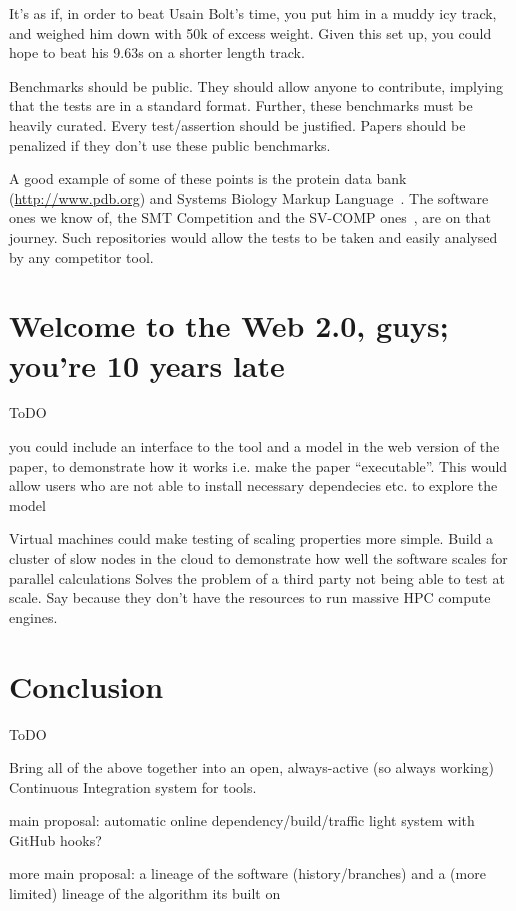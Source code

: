 \documentclass[conference]{IEEEtran}
\begin{document}
It's as if, in order to beat Usain Bolt's time, you put him in a muddy
icy track, and weighed him down with 50k of excess weight. Given this
set up, you could hope to beat his 9.63s on a shorter length track.

Benchmarks should be public. They should allow anyone to contribute,
implying that the tests are in a standard format. Further, these
benchmarks must be heavily curated. Every test/assertion should be
justified. Papers should be penalized if they don't use these public
benchmarks.

A good example of some of these points is the protein data bank
(\url{http://www.pdb.org}) and Systems Biology Markup
Language~\cite{Hucka2003,Chaouiya2013}. The software ones we know of,
the SMT Competition and the SV-COMP ones~\cite{SMTComp2014,
  SVCOMP2015}, are on that journey. Such repositories would
allow the tests to be taken and easily analysed by any competitor
tool.

\section{Welcome to the Web 2.0, guys; you're 10 years late} 

ToDO 

you could include an interface to the tool and a model in the web
version of the paper, to demonstrate how it works i.e. make the paper
``executable''. This would allow users who are not able to install
necessary dependecies etc. to explore the model \cite{Hall2014}

Virtual machines could make testing of scaling properties more simple. 
Build a cluster of slow nodes in the cloud to demonstrate how well the
software scales for parallel calculations
%
Solves the problem of a third party not being able to test at
scale. Say because they don't have the resources to run massive HPC
compute engines.


\section{Conclusion}
\label{sec:Conclusion} 

ToDO 

Bring all of the above together into an open, always-active (so always
working) Continuous Integration system for tools. 

main proposal: automatic online dependency/build/traffic light system
with GitHub hooks?

more main proposal: a lineage of the software (history/branches) and a
(more limited) lineage of the algorithm its built on





\end{document}
